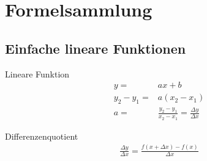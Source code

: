 \section*{Formelsammlung}
\subsection*{Einfache lineare Funktionen}
Lineare Funktion
\begin{align*}
    y=&ax+b \\
    y_2-y_1=&a(x_2-x_1)\\
    a=&\frac{y_2-y_1}{x_2-x_1}=\frac{\Delta y}{\Delta x}
\end{align*}

Differenzenquotient
\begin{align*}
    \frac{\Delta y}{\Delta x}=\frac{f(x+\Delta x)-f(x)}{\Delta x}
\end{align*}
